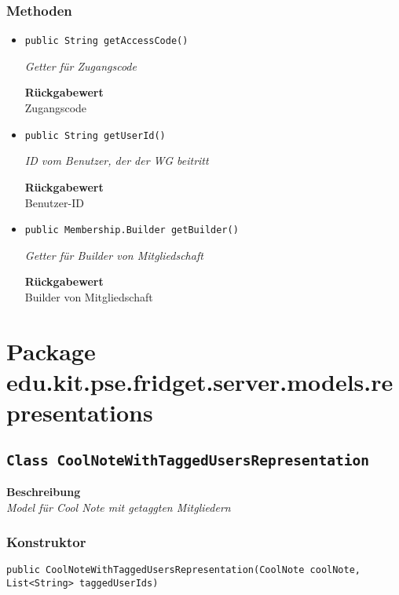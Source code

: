     \subsubsection{Methoden}
    \begin{itemize}
    	\item{\texttt{public String getAccessCode()}}
    	
    	\textit{Getter für Zugangscode}
    	
    	
    	
    	\textbf{Rückgabewert} \\
    	Zugangscode        \item{\texttt{public String getUserId()}}
    	
    	\textit{ID vom Benutzer, der der WG beitritt}
    	
    	
    	
    	\textbf{Rückgabewert} \\
    	Benutzer-ID        \item{\texttt{public Membership.Builder getBuilder()}}
    	
    	\textit{Getter für Builder von Mitgliedschaft}
    	
    	
    	
    	\textbf{Rückgabewert} \\
    	Builder von Mitgliedschaft
    \end{itemize}
    \section{Package edu.kit.pse.fridget.server.models.representations}
    \subsection{\texttt{Class CoolNoteWithTaggedUsersRepresentation}}
    \textbf{Beschreibung} \\
    \textit{Model für Cool Note mit getaggten Mitgliedern}
    \subsubsection{Konstruktor}
    \texttt{public CoolNoteWithTaggedUsersRepresentation(CoolNote coolNote, List<String> taggedUserIds)}

